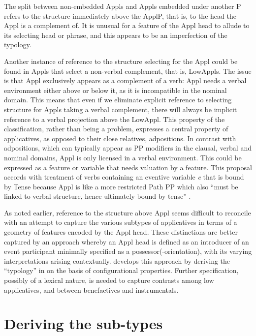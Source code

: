 \documentclass[output=paper,colorlinks,citecolor=brown,modfonts,nonflat]{langsci/langscibook}
\begin{document}
The split between non-embedded Appls and Appls embedded under another {\liv}P refers to the structure immediately above the ApplP, that is, to the head the Appl is a complement of. It is unusual for a feature of the Appl head to allude to its selecting head or phrase, and this appears to be an imperfection of the typology.

Another instance of reference to the structure selecting for the Appl could be found in Appls that select a non-verbal complement, that is, LowAppls. The issue is that Appl exclusively appears as a complement of a verb: Appl needs a verbal environment either above or below it, as it is incompatible in the nominal domain.  This means that even if we eliminate explicit reference to selecting structure for Appls taking a verbal complement, there will always be implicit reference to a verbal projection above the LowAppl. This property of the classification, rather than being a problem, expresses a central property of applicatives, as opposed to their close relatives, adpositions. In contrast with adpositions, which can typically appear as PP modifiers in the clausal, verbal and nominal domains, Appl is only licensed in a verbal environment. This could be expressed as a feature or variable that needs valuation by a {{\liv}} feature. This proposal accords with  treatment of verbs containing an eventive variable \textit{e} that is bound by Tense because Appl is like a more restricted Path PP which also “must be linked to verbal structure, hence ultimately bound by tense” \citep[35]{Svenonius2007}.

As noted earlier, reference to the structure above Appl seems difficult to reconcile with an attempt to capture the various subtypes of applicatives in terms of a geometry of features encoded by the Appl head. These distinctions are better captured by an approach whereby an Appl head is defined as an introducer of an event participant minimally specified as a possessor(-orientation), with its varying interpretations arising contextually.  develops this approach by deriving the “typology” in  on the basis of configurational properties. Further specification, possibly of a lexical nature, is needed to capture contrasts among low applicatives, and between benefactives and instrumentals.

\section{Deriving the sub-types}\label{sec:cuervo:4}
\end{document}
